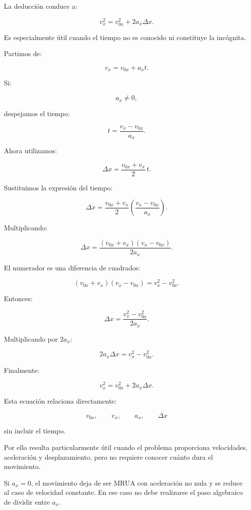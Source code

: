 \begin{respuesta}
La deducción conduce a:

\[ \boxed{v_x^2=v_{0x}^2+2a_x\Delta x}. \]

Es especialmente útil cuando el tiempo no es conocido ni constituye la incógnita.
\end{respuesta}

\begin{explicacion}
Partimos de:

\[ v_x=v_{0x}+a_xt. \]

Si:

\[ a_x\neq0, \]

despejamos el tiempo:

\[
t
=
\frac{v_x-v_{0x}}{a_x}.
\]

Ahora utilizamos:

\[
\Delta x
=
\frac{v_{0x}+v_x}{2}\,t.
\]

Sustituimos la expresión del tiempo:

\[
\Delta x
=
\frac{v_{0x}+v_x}{2}
\left(
\frac{v_x-v_{0x}}{a_x}
\right).
\]

Multiplicando:

\[
\Delta x
=
\frac{
(v_{0x}+v_x)(v_x-v_{0x})
}{
2a_x
}.
\]

El numerador es una diferencia de cuadrados:

\[
(v_{0x}+v_x)(v_x-v_{0x})
=
v_x^2-v_{0x}^2.
\]

Entonces:

\[
\Delta x
=
\frac{
v_x^2-v_{0x}^2
}{
2a_x
}.
\]

Multiplicando por \(2a_x\):

\[
2a_x\Delta x
=
v_x^2-v_{0x}^2.
\]

Finalmente:

\[ \boxed{v_x^2=v_{0x}^2+2a_x\Delta x}. \]

Esta ecuación relaciona directamente:

\[
v_{0x},\qquad
v_x,\qquad
a_x,\qquad
\Delta x
\]

sin incluir el tiempo.

Por ello resulta particularmente útil cuando el problema proporciona velocidades, aceleración y desplazamiento, pero no requiere conocer cuánto dura el movimiento.

Si \(a_x=0\), el movimiento deja de ser MRUA con aceleración no nula y se reduce al caso de velocidad constante. En ese caso no debe realizarse el paso algebraico de dividir entre \(a_x\).
\end{explicacion}